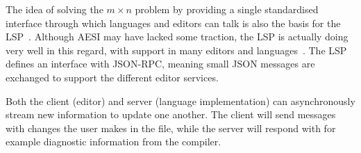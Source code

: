 The idea of solving the $m \times n$ problem by providing a single standardised interface through which languages and editors can talk
is also the basis for the \ac{LSP}~\autocite{lsp}.
Although \ac{AESI} may have lacked some traction, the \ac{LSP} is actually doing very well in this regard, with support in many
editors and languages~\autocite{lsp_support}.
The \ac{LSP} defines an interface with \acs{JSON-RPC}, meaning small \acs{JSON} messages are exchanged to support the different editor services.

Both the client (editor) and server (language implementation) can asynchronously stream new information to update one another.
The client will send messages with changes the user makes in the file, while the server will respond with for example diagnostic
information from the compiler.

